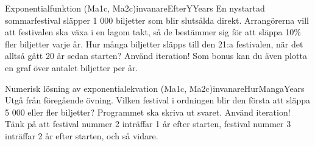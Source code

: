 \begin{matteovning}{Exponentialfunktion (Ma1c, Ma2c)}{invanareEfterYYears}
En nystartad sommarfestival släpper 1 000 biljetter som blir slutsålda direkt. Arrangörerna vill att festivalen ska växa i en lagom takt, så de bestämmer sig för att släppa 10\% fler biljetter varje år. Hur många biljetter släpps till den 21:a festivalen, när det alltså gått 20 år sedan starten? Använd iteration! Som bonus kan du även plotta en graf över antalet biljetter per år.
\end{matteovning}
\begin{matteovning}{Numerisk lösning av exponentialekvation (Ma1c, Ma2c)}{invanareHurMangaYears}
Utgå från föregående övning. Vilken festival i ordningen blir den första att släppa 5 000 eller fler biljetter? Programmet ska skriva ut svaret. Använd iteration! Tänk på att festival nummer 2 inträffar 1 år efter starten, festival nummer 3 inträffar 2 år efter starten, och så vidare.
\end{matteovning}


